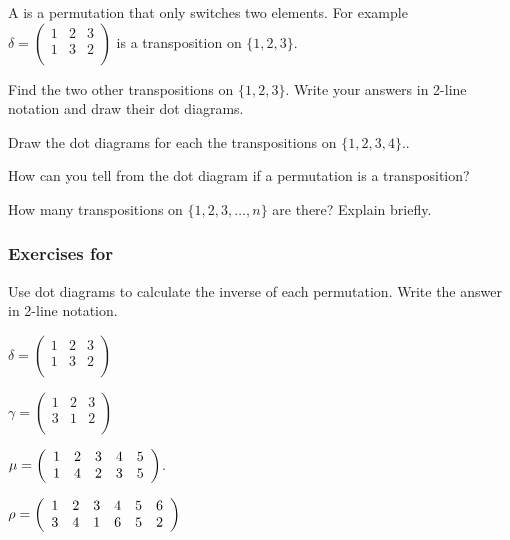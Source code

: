 \begin{exer}[\exerE] %
\label{exer_transpositions}
    A  is a permutation that only switches two elements.  For example $\delta = \left ( \begin{array} {ccc} 1 & 2 & 3  \\ 1 & 3 & 2\\ \end{array} \right )$ is a transposition on $\{1,2,3\}$.
        \begin{exerpart}
            \item Find the two other transpositions on $\{1,2,3\}$.  Write your answers in 2-line notation and draw their dot diagrams.
            \item Draw the dot diagrams for each the transpositions on $\{1,2,3,4\}$..
            \item How can you tell from the dot diagram if a permutation is a transposition?
            \item How many transpositions on $\{1,2,3, \ldots, n\}$ are there?  Explain briefly.
        \end{exerpart}
\end{exer}


\subsubsection*{Exercises for  \subinverses}

\begin{exer}[\exerP] %
\label{exer_perms_inverse}
    Use dot diagrams to calculate the inverse of each permutation.  Write the answer in 2-line notation.
        \begin{exerpart}
            \item $\displaystyle \delta = \left ( \begin{array} {ccc} 1 & 2 & 3  \\ 1 & 3 & 2 \\ \end{array} \right )$
            \item $\gamma= \left ( \begin{array} {ccc} 1 & 2 & 3 \\ 3 & 1 & 2 \\ \end{array} \right )$
            \item $\mu= \displaystyle \left ( \begin{array} {ccc cc} 1 & 2 & 3 & 4 & 5  \\ 1 & 4 & 2 & 3 & 5\\ \end{array} \right )$.
            \item $\displaystyle \rho = \left ( \begin{array} {ccc ccc} 1 & 2 & 3 & 4 & 5 & 6 \\ 3 & 4 & 1 & 6 & 5 & 2\\ \end{array} \right )$
        \end{exerpart}
\end{exer}

